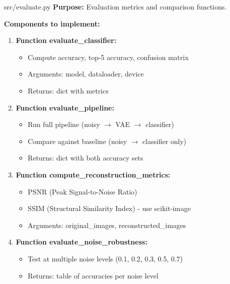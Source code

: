 \documentclass[11pt,a4paper]{article}
\begin{document}
\begin{filebox}{src/evaluate.py}
\textbf{Purpose:} Evaluation metrics and comparison functions.

\textbf{Components to implement:}
\begin{enumerate}[noitemsep]
    \item \textbf{Function evaluate\_classifier:}
    \begin{itemize}[noitemsep]
        \item Compute accuracy, top-5 accuracy, confusion matrix
        \item Arguments: model, dataloader, device
        \item Returns: dict with metrics
    \end{itemize}
    \item \textbf{Function evaluate\_pipeline:}
    \begin{itemize}[noitemsep]
        \item Run full pipeline (noisy $\rightarrow$ VAE $\rightarrow$ classifier)
        \item Compare against baseline (noisy $\rightarrow$ classifier only)
        \item Returns: dict with both accuracy sets
    \end{itemize}
    \item \textbf{Function compute\_reconstruction\_metrics:}
    \begin{itemize}[noitemsep]
        \item PSNR (Peak Signal-to-Noise Ratio)
        \item SSIM (Structural Similarity Index) - use scikit-image
        \item Arguments: original\_images, reconstructed\_images
    \end{itemize}
    \item \textbf{Function evaluate\_noise\_robustness:}
    \begin{itemize}[noitemsep]
        \item Test at multiple noise levels (0.1, 0.2, 0.3, 0.5, 0.7)
        \item Returns: table of accuracies per noise level
    \end{itemize}
\end{enumerate}
\end{filebox}

\newpage
\end{document}
